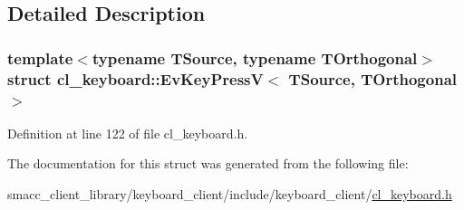 \subsection{Detailed Description}
\subsubsection*{template$<$typename T\+Source, typename T\+Orthogonal$>$\newline
struct cl\+\_\+keyboard\+::\+Ev\+Key\+Press\+V$<$ T\+Source, T\+Orthogonal $>$}



Definition at line 122 of file cl\+\_\+keyboard.\+h.



The documentation for this struct was generated from the following file\+:\begin{DoxyCompactItemize}
\item 
smacc\+\_\+client\+\_\+library/keyboard\+\_\+client/include/keyboard\+\_\+client/\hyperlink{cl__keyboard_8h}{cl\+\_\+keyboard.\+h}\end{DoxyCompactItemize}
